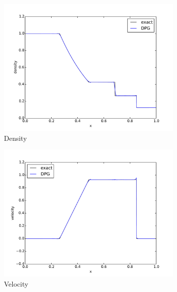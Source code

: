 \documentclass{parcfd2014}
\begin{document}
\begin{figure}[h]
\centering
\begin{subfigure}[c]{0.3\textwidth}
\centering
\includegraphics[width=\textwidth]{figs/Sod1e-5/den15.pdf}
\caption{Density}
\label{fig:sod_den14}
\end{subfigure}
\begin{subfigure}[c]{0.3\textwidth}
\centering
\includegraphics[width=\textwidth]{figs/Sod1e-5/vel15.pdf}
\caption{Velocity}
\label{fig:sod_vel14}
\end{subfigure}
\begin{subfigure}[c]{0.3\textwidth}
\centering

\end{subfigure}
\end{figure}
\end{document}
